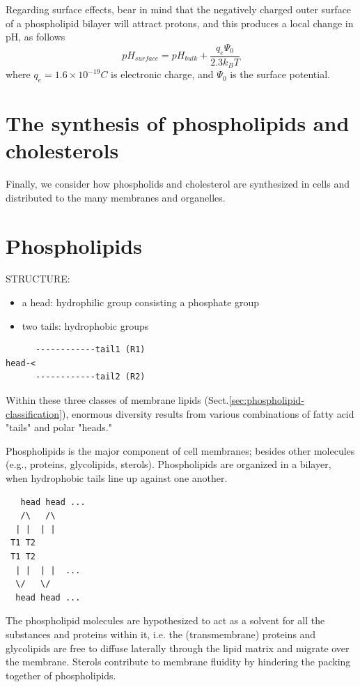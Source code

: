 Regarding surface effects, bear in mind that the negatively charged
outer surface of a phospholipid bilayer will attract protons, and
this produces a local change in pH, as follows
\begin{equation}
  \label{eq:13}
  pH_{surface} = pH_{bulk} + \frac{q_e\Psi_0}{2.3k_BT}
\end{equation}
where $q_e = 1.6\times 10^{-19} C$ is electronic charge, and $\Psi_0$
is the surface potential.
\section{The synthesis of phospholipids and cholesterols}
\label{sec:synth-phosph-chol}
\label{sec:cholesterls}

Finally, we consider how phospholids and cholesterol are synthesized
in cells and distributed to the many membranes and organelles.

\section{Phospholipids}
\label{sec:phospholipids}

STRUCTURE:
\begin{itemize}
  \item a head: hydrophilic group consisting a phosphate group
  
  \item two tails: hydrophobic groups
\end{itemize}
\begin{verbatim}
      ------------tail1 (R1)
head-<
      ------------tail2 (R2)
\end{verbatim}
Within these three classes of membrane lipids
(Sect.\ref{sec:phospholipid-classification}), enormous diversity results from
various combinations of fatty acid "tails" and polar "heads."

Phospholipids is the major component of cell membranes; besides other molecules
(e.g., proteins, glycolipids, sterols). Phospholipids are organized in a
bilayer, when hydrophobic tails line up against one another.
\begin{verbatim}
   head head ...
   /\   /\
  | |  | |
 T1 T2
 T1 T2
  | |  | |  ...
  \/   \/
  head head ...
\end{verbatim}

The phospholipid molecules are hypothesized to act as a solvent for all the
substances and proteins within it, i.e. the (transmembrane) proteins and
glycolipids are free to diffuse laterally through the lipid matrix and migrate
over the membrane. Sterols contribute to membrane fluidity by hindering the
packing together of phospholipids.

